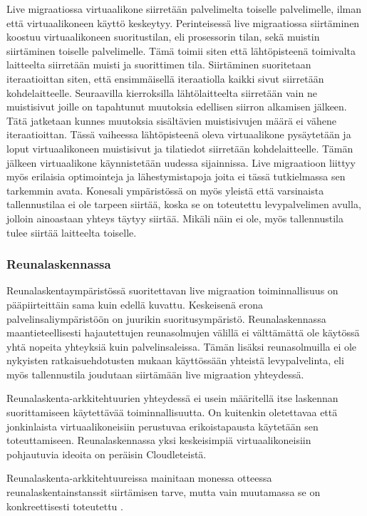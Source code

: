 Live migraatiossa virtuaalikone siirretään palvelimelta toiselle palvelimelle, ilman että virtuaalikoneen käyttö keskeytyy. Perinteisessä live migraatiossa siirtäminen koostuu virtuaalikoneen suoritustilan, eli prosessorin tilan, sekä muistin siirtäminen toiselle palvelimelle. Tämä toimii siten että lähtöpisteenä toimivalta laitteelta siirretään muisti ja suorittimen tila. 
Siirtäminen suoritetaan iteraatioittan siten, että ensimmäisellä iteraatiolla kaikki sivut siirretään kohdelaitteelle.
Seuraavilla kierroksilla lähtölaitteelta siirretään vain ne muistisivut joille on tapahtunut muutoksia edellisen siirron alkamisen jälkeen. 
Tätä jatketaan kunnes muutoksia sisältävien muistisivujen määrä ei vähene iteraatioittan.
Tässä vaiheessa lähtöpisteenä oleva virtuaalikone pysäytetään ja loput virtuaalikoneen muistisivut ja tilatiedot siirretään kohdelaitteelle. Tämän jälkeen virtuaalikone käynnistetään uudessa sijainnissa. 
Live migraatioon liittyy myös erilaisia optimointeja ja lähestymistapoja joita ei tässä tutkielmassa sen tarkemmin avata. 
Konesali ympäristössä on myös yleistä että varsinaista tallennustilaa ei ole tarpeen siirtää, koska se on toteutettu levypalvelimen avulla, jolloin ainoastaan yhteys täytyy siirtää. Mikäli näin ei ole, myös tallennustila tulee siirtää laitteelta toiselle. 


\subsubsection*{Reunalaskennassa}
Reunalaskentaympäristössä suoritettavan live migraation toiminnallisuus on pääpiirteittäin sama kuin edellä kuvattu. Keskeisenä erona palvelinsaliympäristöön on juurikin suoritusympäristö. Reunalaskennassa maantieteellisesti hajautettujen reunasolmujen välillä ei välttämättä ole käytössä yhtä nopeita yhteyksiä kuin palvelinsaleissa. Tämän lisäksi reunasolmuilla ei ole nykyisten ratkaisuehdotusten mukaan käyttössään yhteistä levypalvelinta, eli myös tallennustila joudutaan siirtämään live migraation yhteydessä. 


Reunalaskenta-arkkitehtuurien yhteydessä ei usein määritellä itse laskennan suorittamiseen käytettävää toiminnallisuutta. On kuitenkin oletettavaa että jonkinlaista virtuaalikoneisiin perustuvaa erikoistapausta käytetään sen toteuttamiseen.
Reunalaskennassa yksi keskeisimpiä virtuaalikoneisiin pohjautuvia ideoita on peräisin Cloudleteistä. 


Reunalaskenta-arkkitehtuureissa mainitaan monessa otteessa reunalaskentainstanssit siirtämisen tarve, mutta vain muutamassa se on konkreettisesti toteutettu \cite{lahteet}. 


